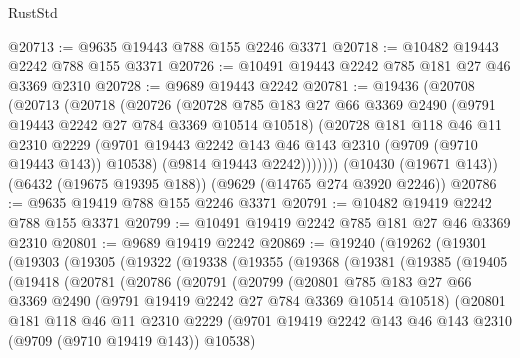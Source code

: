 \begin{lexlean}{RustStd}
\begin{coremodule}
@20713 := @9635 @19443 @788 @155 @2246 @3371
@20718 := @10482 @19443 @2242 @788 @155 @3371
@20726 := @10491 @19443 @2242 @785 @181 @27 @46 @3369 @2310
@20728 := @9689 @19443 @2242
@20781 := @19436
    (@20708
      (@20713
        (@20718
          (@20726
            (@20728
              @785
              @183
              @27
              @66
              @3369
              @2490
              (@9791 @19443 @2242 @27 @784 @3369 @10514 @10518)
              (@20728
                @181
                @118
                @46
                @11
                @2310
                @2229
                (@9701 @19443 @2242 @143 @46 @143 @2310 (@9709 (@9710 @19443 @143)) @10538)
                (@9814 @19443 @2242)))))))
    (@10430 (@19671 @143))
    (@6432 (@19675 @19395 @188))
    (@9629 (@14765 @274 @3920 @2246))
@20786 := @9635 @19419 @788 @155 @2246 @3371
@20791 := @10482 @19419 @2242 @788 @155 @3371
@20799 := @10491 @19419 @2242 @785 @181 @27 @46 @3369 @2310
@20801 := @9689 @19419 @2242
@20869 := @19240
    (@19262
      (@19301
        (@19303
          (@19305
            (@19322
              (@19338
                (@19355
                  (@19368
                    (@19381
                      (@19385
                        (@19405
                          (@19418
                            (@20781
                              (@20786
                                (@20791
                                  (@20799
                                    (@20801
                                      @785
                                      @183
                                      @27
                                      @66
                                      @3369
                                      @2490
                                      (@9791 @19419 @2242 @27 @784 @3369 @10514 @10518)
                                      (@20801
                                        @181
                                        @118
                                        @46
                                        @11
                                        @2310
                                        @2229
                                        (@9701
                                          @19419
                                          @2242
                                          @143
                                          @46
                                          @143
                                          @2310
                                          (@9709 (@9710 @19419 @143))
                                          @10538)

\end{coremodule}
\end{lexlean}
